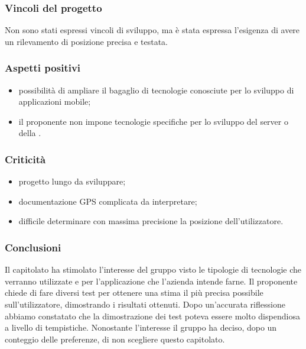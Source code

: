 	\subsubsection{Vincoli del progetto}
		Non sono stati espressi vincoli di sviluppo, ma è stata espressa l'esigenza di avere un rilevamento di posizione precisa e testata.

	\subsubsection{Aspetti positivi}
		\begin{itemize}
			\item possibilità di ampliare il bagaglio di tecnologie conosciute per lo sviluppo di applicazioni mobile;
			\item il proponente non impone tecnologie specifiche per lo sviluppo del server o
			della .
		\end{itemize}

	\subsubsection{Criticità}
		\begin{itemize}
			\item progetto lungo da sviluppare;
			\item documentazione GPS complicata da interpretare;
			\item difficile determinare con massima precisione la posizione dell'utilizzatore.
		\end{itemize}

	\subsubsection{Conclusioni}
		Il capitolato ha stimolato l'interesse del gruppo visto le tipologie di tecnologie che verranno utilizzate e per l'applicazione che l'azienda intende farne. Il proponente chiede di fare diversi test per ottenere una stima il più precisa possibile sull'utilizzatore, dimostrando i risultati ottenuti. Dopo un'accurata riflessione abbiamo constatato che la dimostrazione dei test poteva essere molto dispendiosa a livello di tempistiche. Nonostante l'interesse il gruppo ha deciso, dopo un conteggio delle preferenze, di non scegliere questo capitolato.
